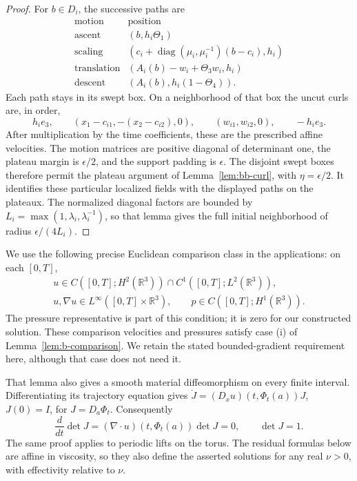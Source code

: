 \begin{proof}
For $b\in D_i$, the successive paths are
\[
 \begin{array}{c|c}
 \text{motion}&\text{position}\\\hline
 \text{ascent}&(b,h_i\Theta_1)\\
 \text{scaling}&(c_i+\operatorname{diag}(\mu_i,\mu_i^{-1})(b-c_i),h_i)\\
 \text{translation}&(A_i(b)-w_i+\Theta_3w_i,h_i)\\
 \text{descent}&(A_i(b),h_i(1-\Theta_4)).
 \end{array}
\]
Each path stays in its swept box.  On a neighborhood of that box the
uncut curls are, in order,
\[
 h_ie_3,\qquad (x_1-c_{i1},-(x_2-c_{i2}),0),\qquad
 (w_{i1},w_{i2},0),\qquad -h_ie_3.
\]
After multiplication by the time coefficients, these are the prescribed
affine velocities.  The motion matrices are positive diagonal of determinant
one, the plateau margin is $\epsilon/2$, and the support padding is
$\epsilon$.  The disjoint swept boxes therefore permit the plateau
argument of Lemma~\ref{lem:bb-curl}, with $\eta=\epsilon/2$.
It identifies these particular localized fields with the displayed
paths on the plateaux.  The normalized diagonal factors are bounded by
$L_i=\max(1,\lambda_i,\lambda_i^{-1})$, so that lemma gives the
full initial neighborhood of radius $\epsilon/(4L_i)$.
\end{proof}

We use the following precise Euclidean comparison class in the applications:
on each $[0,T]$,
\begin{equation}\label{ba:euclidean-comparison-class}
 \begin{gathered}
 u\in C([0,T];H^2(\mathbb R^3))\cap C^1([0,T];L^2(\mathbb R^3)),\\
 u,\nabla u\in L^\infty([0,T]\times\mathbb R^3),\qquad
 p\in C([0,T];H^1(\mathbb R^3)).
 \end{gathered}
\end{equation}
The pressure representative is part of this condition; it is zero for
our constructed solution.  These comparison velocities and pressures
satisfy case (i) of Lemma~\ref{lem:b-comparison}.  We retain the stated
bounded-gradient requirement here, although that case does not need it.

That lemma also gives a smooth material diffeomorphism on every finite
interval.  Differentiating its trajectory equation gives
$\dot J=(D_xu)(t,\Phi_t(a))J$, $J(0)=I$, for $J=D_a\Phi_t$.
Consequently
\begin{equation}\label{ba:material-volume}
 \frac d{dt}\det J=(\nabla\cdot u)(t,\Phi_t(a))\det J=0,
 \qquad \det J=1.
\end{equation}
The same proof applies to periodic lifts on the torus.  The residual
formulas below are affine in viscosity, so they also define the asserted
solutions for any real $\nu>0$, with effectivity relative to $\nu$.

